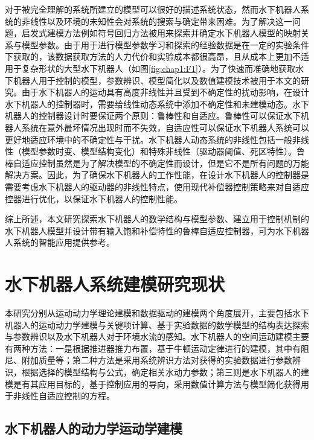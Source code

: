 对于被完全理解的系统所建立的模型可以很好的描述系统状态，然而水下机器人系统的非线性以及环境的未知性会对系统的搜索与确定带来困难。为了解决这一问题，启发式建模方法例如符号回归方法被用来探索并确定水下机器人模型的映射关系与模型参数。由于用于进行模型参数学习和探索的经验数据是在一定的实验条件下获取的，该数据获取方法的人力代价和实验成本都很高昂，且从成本上更加不适用于复杂形状的大型水下机器人（如图\ref{fig:chap1:F1}）\cite{yang2014modeling}。为了快速而准确地获取水下机器人用于控制的模型，参数辨识、模型简化以及数值建模技术被用于本文的研究。由于水下机器人的运动具有高度非线性并且受到不确定性的扰动影响，在设计水下机器人的控制器时，需要给线性动态系统中添加不确定性和未建模动态\cite{valladarez2015adaptive}。水下机器人的控制器设计时要保证两个原则：鲁棒性和自适应。鲁棒性可以保证水下机器人系统在意外最坏情况出现时而不失效，自适应性可以保证水下机器人系统可以更好地适应环境中的不确定性与干扰。水下机器人动态系统的非线性包括一般非线性（模型参数时变、模型结构变化）和特殊非线性（驱动器阈值、死区特性）\cite{Wu2018Pitch}。鲁棒自适应控制虽然是为了解决模型的不确定性而设计，但是它不是所有问题的万能解决方案\cite{lavretsky2013robust}。因此，为了确保水下机器人的工作性能，在设计水下机器人的控制器是需要考虑水下机器人的驱动器的非线性特点，使用现代补偿器控制策略来对自适应控器进行优化，以保证水下机器人的控制性能。

综上所述，本文研究探索水下机器人的数学结构与模型参数、建立用于控制机制的水下机器人模型并设计带有输入饱和补偿特性的鲁棒自适应控制器，可为水下机器人系统的智能应用提供参考。


\section{水下机器人系统建模研究现状 }

本研究分别从运动动力学理论建模和数据驱动的建模两个角度展开，主要包括水下机器人的运动动力学建模与关键项计算、基于实验数据的数学模型的结构表达探索与参数辨识以及水下机器人对于环境水流的感知。水下机器人的空间运动建模主要有两种方法：一是根据推进器推力布置，基于牛顿运动定律进行的建模，其中有阻尼、附加质量等；第二种方法是采用系统辨识方法对获得的实验数据进行参数辨识，根据选择的模型结构与公式，确定相关水动力参数；第三则是水下机器人的建模是有其应用目标的，基于控制应用的导向，采用数值计算方法与模型简化获得用于非线性自适应控制的方程。

\subsection{水下机器人的动力学运动学建模  }

